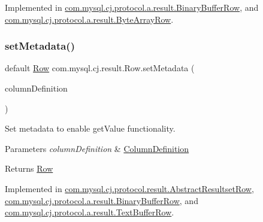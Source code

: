 Implemented in \mbox{\hyperlink{classcom_1_1mysql_1_1cj_1_1protocol_1_1a_1_1result_1_1_binary_buffer_row_ab30b2392287e18d1a0d7662a3090493a}{com.\+mysql.\+cj.\+protocol.\+a.\+result.\+Binary\+Buffer\+Row}}, and \mbox{\hyperlink{classcom_1_1mysql_1_1cj_1_1protocol_1_1a_1_1result_1_1_byte_array_row_a2606ac2688da3531d2e72bfd51949632}{com.\+mysql.\+cj.\+protocol.\+a.\+result.\+Byte\+Array\+Row}}.

\mbox{\label{interfacecom_1_1mysql_1_1cj_1_1result_1_1_row_ab80b0f47123d2771840acead9bc094d0}} 
\subsubsection{\texorpdfstring{set\+Metadata()}{setMetadata()}}
{\footnotesize\ttfamily default \mbox{\hyperlink{interfacecom_1_1mysql_1_1cj_1_1result_1_1_row}{Row}} com.\+mysql.\+cj.\+result.\+Row.\+set\+Metadata (\begin{DoxyParamCaption}\item[{\mbox{\hyperlink{interfacecom_1_1mysql_1_1cj_1_1protocol_1_1_column_definition}{Column\+Definition}}}]{column\+Definition }\end{DoxyParamCaption})}

Set metadata to enable get\+Value functionality.


\begin{DoxyParams}{Parameters}
{\em column\+Definition} & \mbox{\hyperlink{}{Column\+Definition}} \\
\hline
\end{DoxyParams}
\begin{DoxyReturn}{Returns}
\mbox{\hyperlink{interfacecom_1_1mysql_1_1cj_1_1result_1_1_row}{Row}} 
\end{DoxyReturn}


Implemented in \mbox{\hyperlink{classcom_1_1mysql_1_1cj_1_1protocol_1_1result_1_1_abstract_resultset_row_a9f17330b25a79a752370017c78d73d08}{com.\+mysql.\+cj.\+protocol.\+result.\+Abstract\+Resultset\+Row}}, \mbox{\hyperlink{classcom_1_1mysql_1_1cj_1_1protocol_1_1a_1_1result_1_1_binary_buffer_row_a2bd5930ed5755dca5600e9ee96bad328}{com.\+mysql.\+cj.\+protocol.\+a.\+result.\+Binary\+Buffer\+Row}}, and \mbox{\hyperlink{classcom_1_1mysql_1_1cj_1_1protocol_1_1a_1_1result_1_1_text_buffer_row_a09f38001a62bec7e4723062fb7b1c156}{com.\+mysql.\+cj.\+protocol.\+a.\+result.\+Text\+Buffer\+Row}}.


